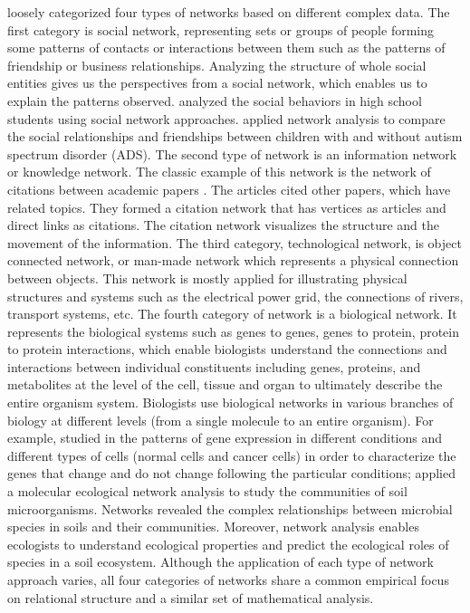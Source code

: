 \documentclass[12pt, oneside]{report}
\begin{document}
\citet{newman2003structure} loosely categorized four types of networks based on different complex data. The first category is social network, representing sets or groups of people forming some patterns of contacts or interactions between them such as the patterns of friendship or business relationships. Analyzing the structure of whole social entities gives us the perspectives from a social network, which enables us to explain the patterns observed. \citet{moody2001race} analyzed the social behaviors in high school students using social network approaches. \citep{Kasari2011social} applied network analysis to compare the social relationships and friendships between children with and without autism spectrum disorder (ADS). The second type of network is an information network or knowledge network. The classic example of this network is the network of citations between academic papers \citep{newman2003structure}. The articles cited other papers, which have related topics. They formed a citation network that has vertices as articles and direct links as citations. The citation network visualizes the structure and the movement of the information. The third category, technological network, is object connected network, or man-made network which represents a physical connection between objects. This network is mostly applied for illustrating physical structures and systems such as the electrical power grid, the connections of rivers, transport systems, etc. The fourth category of network is a biological network. It represents the biological systems such as genes to genes, genes to protein, protein to protein interactions, which enable biologists understand the connections and interactions between individual constituents including genes, proteins, and metabolites at the level of the cell, tissue and organ to ultimately describe the entire organism system. Biologists use biological networks in various branches of biology at different levels (from a single molecule to an entire organism). For example, \citet{yang2014gene, barabasi2004network} studied in the patterns of gene expression in different conditions and different types of cells (normal cells and cancer cells) in order to characterize the genes that change and do not change following the particular conditions; \citet{freilich2010large} applied a molecular ecological network analysis to study the communities of soil microorganisms. Networks revealed the complex relationships between microbial species in soils and their communities. Moreover, network analysis enables ecologists to understand ecological properties and predict the ecological roles of species in a soil ecosystem. Although the application of each type of network approach varies, all four categories of networks share a common empirical focus on relational structure and a similar set of mathematical analysis. 
\end{document}
